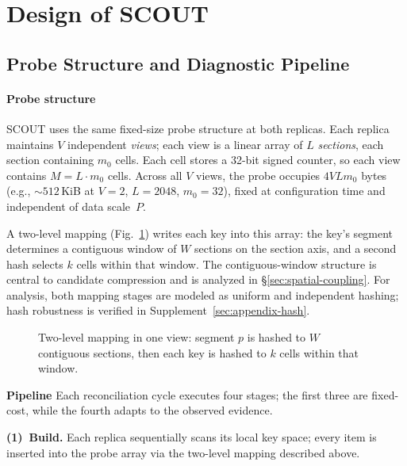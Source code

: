 \section{Design of SCOUT}
\label{sec:design}


\subsection{Probe Structure and Diagnostic Pipeline}
\label{sec:overview}

\paragraph{Probe structure}
SCOUT uses the same fixed-size probe structure at both
replicas.  Each replica maintains $V$ independent \emph{views};
each view is a linear array of $L$ \emph{sections}, each
section containing $m_0$ cells. Each cell stores a 32-bit
signed counter, so each view contains $M = L \cdot m_0$ cells.
Across all $V$ views, the probe occupies $4VLm_0$ bytes
(e.g., ${\sim}512$\,KiB at $V{=}2$, $L{=}2048$, $m_0{=}32$),
fixed at configuration time and independent of data scale~$P$.

A two-level mapping (Fig.~\ref{fig:scout-mapping-structure-a})
writes each key into this array: the key's segment determines
a contiguous window of $W$ sections on the section axis, and a
second hash selects $k$ cells within that window.  The
contiguous-window structure is central to candidate
compression and is analyzed in
\S\ref{sec:spatial-coupling}.
For analysis, both mapping stages are modeled as uniform and
independent hashing; hash robustness is verified in Supplement~\ref{sec:appendix-hash}.

\begin{figure}[!htbp]
\centering

\caption{Two-level mapping in one view: segment $p$ is hashed
to $W$ contiguous sections, then each key is hashed to $k$
cells within that window.}
\label{fig:scout-mapping-structure-a}
\end{figure}

\noindent\textbf{Pipeline}\quad
Each reconciliation cycle executes four stages; the first
three are fixed-cost, while the fourth adapts to the observed
evidence.

\textbf{(1)~Build.}  Each replica sequentially scans its local key space; every item is inserted into the probe array via the two-level mapping described above.

